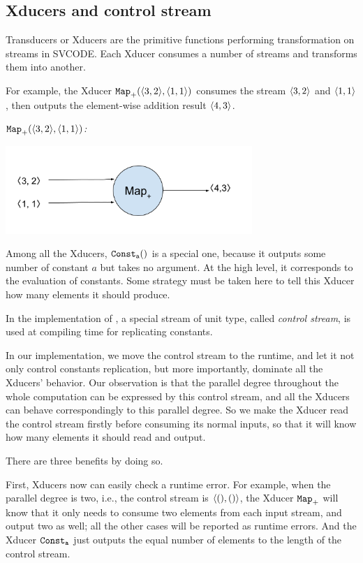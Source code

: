 \subsection{Xducers and control stream}

Transducers or Xducers are the primitive functions performing transformation on streams in SVCODE. 
Each Xducer consumes a number of streams and transforms them into another. 

For example, the Xducer $\map{+}(\<3,2\'>, \< 1,1\'>)$ consumes the stream $\<3,2\'>$ and $\< 1,1\'>$, then outputs 
the element-wise addition result $\<4, 3\'>$. 

\begin{example} \emph{$\map{+}(\<3,2\'>, \< 1,1\'>)$:}\\
	\begin{center}
		\includegraphics[width=0.7\textwidth]{fig/mapxducer.png}
	\end{center}
\end{example}


Among all the Xducers, $\mathtt{Const_{a}()}$ is a special one, because it outputs some number of constant $a$ but takes no argument.  
At the high level, it corresponds to the evaluation of constants.
Some strategy must be taken here to tell this Xducer how many elements it should produce.

In the implementation of \cite{MF16}, a special stream of unit type, called \emph{control stream}, is used at compiling time for replicating constants.

In our implementation, we move the control stream to the runtime, and let it not only control constants replication, but more importantly, dominate all the Xducers' behavior. 
Our observation is that the parallel degree throughout the whole computation can be expressed by this control stream, and all the Xducers can behave correspondingly to this parallel degree. 
So we make the Xducer read the control stream firstly before consuming its normal inputs, so that it will know how many elements it should read and output.

There are three benefits by doing so.

First, Xducers now can easily check a runtime error. 
For example, when the parallel degree is two, i.e., the control stream is $\< (),() \'>$, the Xducer $\mathtt{Map}_{+}$ will know that it only needs to consume two elements from each input stream, and output two as well; all the other cases will be reported as runtime errors.  
And the Xducer $\mathtt{Const_{a}}$ just outputs the equal number of elements to the length of the control stream.

